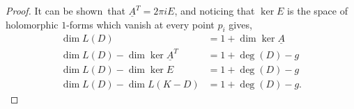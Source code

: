\begin{theorem}
\begin{proof}
		It can be shown\sidenotemark\ that $ \underline{A}^{T} = 2 \pi i E $, and
		noticing that $ \ker E$ is the space of holomorphic $ 1 $-forms which vanish
		at every point $ p_{i} $ gives,
		\begin{align*}
			\dim L(D)                              & = 1 + \dim\ker \underline{A} \\
			\dim L(D) - \dim\ker \underline{A}^{T} & = 1 + \deg(D) - g            \\
			\dim L(D) - \dim\ker E                 & = 1 + \deg(D) - g            \\
			\dim L(D) - \dim L(K-D)                & = 1 + \deg(D) - g.
		\end{align*}
	\end{proof}
\end{theorem}
